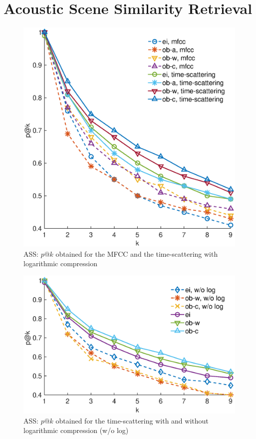 \documentclass[journal]{IEEEtran}
\begin{document}
\section{Acoustic Scene Similarity Retrieval}

\begin{figure}
\begin{center}
\includegraphics[width=\columnwidth]{gfx/unsupervised_test3.eps}
\caption{ASS: $p@k$ obtained for the MFCC and the time-scattering with logarithmic compression}
\label{fig:ASS_1}
\end{center}
\end{figure}

\begin{figure}
\begin{center}
\includegraphics[width=\columnwidth]{gfx/unsupervised_test2.eps}
\caption{ASS: $p@k$ obtained for the time-scattering with and without logarithmic compression (w/o log)}
\label{fig:ASS_2}
\end{center}
\end{figure}
\end{document}

